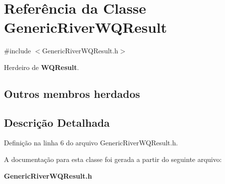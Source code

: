 \section{Referência da Classe Generic\+River\+W\+Q\+Result}
\label{class_generic_river_w_q_result}


{\ttfamily \#include $<$Generic\+River\+W\+Q\+Result.\+h$>$}



Herdeiro de {\bf W\+Q\+Result}.

\subsection*{Outros membros herdados}


\subsection{Descrição Detalhada}


Definição na linha 6 do arquivo Generic\+River\+W\+Q\+Result.\+h.



A documentação para esta classe foi gerada a partir do seguinte arquivo\+:\begin{DoxyCompactItemize}
\item 
{\bf Generic\+River\+W\+Q\+Result.\+h}\end{DoxyCompactItemize}
